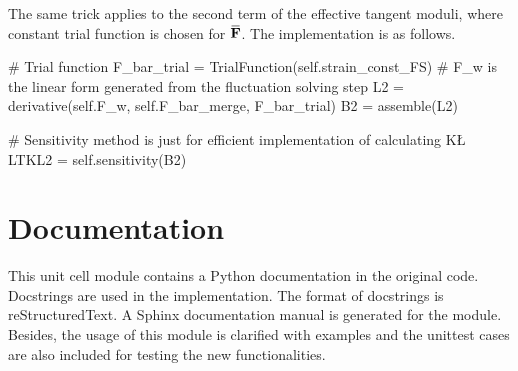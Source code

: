 \documentclass[10pt,a4paper]{scrreprt}
\newcommand{\overbar}[1]{\mkern 1.5mu\overline{\mkern-1.5mu#1\mkern-1.5mu}\mkern 1.5mu}
\begin{document}
The same trick applies to the second term of the effective tangent moduli, where constant trial function is chosen for $\overbar{\mathbf{F}}$. The implementation is as follows. 
\begin{python}
# Trial function
F_bar_trial = TrialFunction(self.strain_const_FS)
# F_w is the linear form generated from the fluctuation solving step
L2 = derivative(self.F_w, self.F_bar_merge, F_bar_trial)
B2 = assemble(L2)

# Sensitivity method is just for efficient implementation of calculating K\L
LTKL2 = self.sensitivity(B2)
\end{python}

\section{Documentation}
This unit cell module contains a Python documentation in the original code. Docstrings are used in the implementation. The format of docstrings is reStructuredText. A Sphinx documentation manual is generated for the module. Besides, the usage of this module is clarified with examples and the unittest cases are also included for testing the new functionalities.
\end{document}
